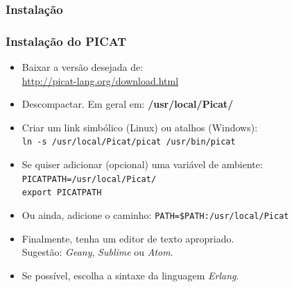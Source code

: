 
\subsubsection{Instalação}
\begin{frame}
    \frametitle{Instalação do PICAT}

  \begin{itemize}
  
  	\item Baixar a versão desejada de:\\ 
    \hspace{8mm} \url{http://picat-lang.org/download.html}
    
   	\item Descompactar. Em geral em: \textbf{/usr/local/Picat/}
    
    \item Criar um link simbólico (Linux) ou atalhos (Windows):\\ 
    
   	\hspace{8mm}\texttt{ln -s /usr/local/Picat/picat   \hspace{3mm}   /usr/bin/picat}
    
    \item Se quiser adicionar (opcional) uma variável de ambiente:\\
          \hspace{8mm} \texttt{PICATPATH=/usr/local/Picat/}\\
          \hspace{8mm} \texttt{export PICATPATH}

    \item Ou ainda, adicione o caminho: \texttt{PATH=\$PATH:/usr/local/Picat}

   	\item Finalmente, tenha um editor de texto apropriado.\\
    \hspace{8mm} Sugestão: \textit{Geany}, \textit{Sublime} ou \textit{Atom}.
     
    \item Se possível, escolha a sintaxe da linguagem \textit{Erlang}.
    
    
  \end{itemize}



\end{frame}


